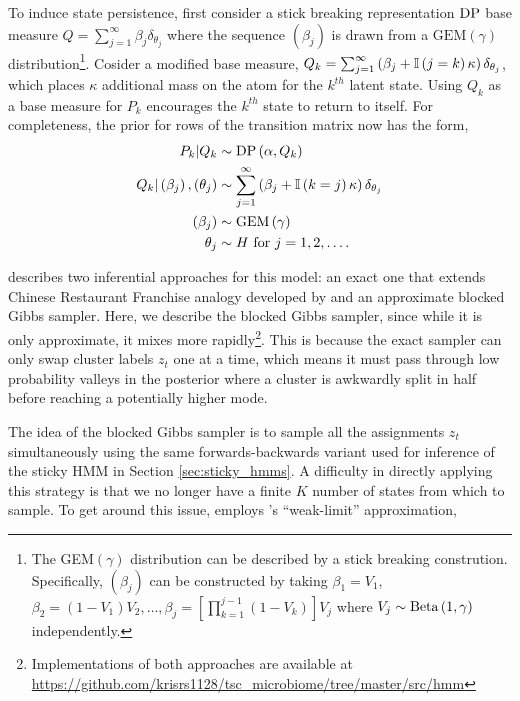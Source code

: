 \documentclass[14pt]{extarticle}
\begin{document}
To induce state persistence, first consider a stick breaking representation
$\textnormal{DP}$ base measure $Q = \sum_{j = 1}^{\infty} \beta_j \delta_{\theta_j}$ where
the sequence $\left(\beta_j\right)$ is drawn from a
$\text{GEM}\left(\gamma\right)$ distribution\footnote{The
  GEM$\left(\gamma\right)$ distribution \citep{gnedin2001characterization} can
  be described by a stick breaking constrution. Specifically,
  $\left(\beta_{j}\right)$ can be constructed by taking $\beta_{1} = V_1$,
  $\beta_2 = \left(1 - V_1\right)V_2, \dots, \beta_{j} = \left[\prod_{k = 1}^{j
      - 1}\left(1 - V_k\right)\right]V_j$ where $V_j \sim \textnormal{Beta}\left(1,
  \gamma\right)$ independently. }. Cosider a modified base measure,
$Q_k = \sum_{j = 1}^{\infty} \left(\beta_j + \mathbb{I}\left({j =
    k}\right)\kappa\right)\delta_{\theta_j}$, which places $\kappa$ additional mass on
  the atom for the $k^{th}$ latent state. Using $Q_k$ as a base measure for
  $P_k$ encourages the $k^{th}$ state to return to itself. For completeness, the
  prior for rows of the transition matrix now has the form,
\begin{align*}
  P_k \vert Q_k &\sim \textnormal{DP}\left(\alpha, Q_k\right) \\
  Q_k \vert \left(\beta_j\right), \left(\theta_j\right) &\sim \sum_{j = 1}^{\infty} \left(\beta_j + \mathbb{I}\left({k = j}\right)\kappa\right)\delta_{\theta_j} \\
  \left(\beta_j\right) &\sim \text{GEM}\left(\gamma\right) \\
  \theta_j &\sim H \text{ for }j = 1, 2, \dots.
\end{align*}

\cite{fox2009bayesian} describes two inferential approaches for this model: an
exact one that extends Chinese Restaurant Franchise analogy developed by
\citep{teh2006hierarchical} and an approximate blocked Gibbs sampler. Here, we
describe the blocked Gibbs sampler, since while it is only approximate, it mixes
more rapidly\footnote{Implementations of both approaches are available at
  \url{https://github.com/krisrs1128/tsc\_microbiome/tree/master/src/hmm}}. This
  is because the exact sampler can only swap cluster labels $z_t$ one at a time,
  which means it must pass through low probability valleys in the posterior
  where a cluster is awkwardly split in half before reaching a potentially
  higher mode.

The idea of the blocked Gibbs sampler is to sample all the assignments $z_t$
simultaneously using the same forwards-backwards variant used for inference of
the sticky HMM in Section \ref{sec:sticky_hmms}. A difficulty in directly
applying this strategy is that we no longer have a finite $K$ number of states
from which to sample. To get around this issue, \cite{fox2008hdp} employs
\cite{ishwaran2002exact}'s ``weak-limit'' approximation,
\end{document}

